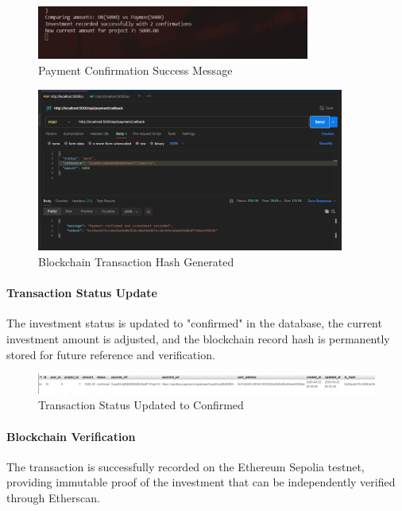 \begin{figure}[htbp]
    \centering
    \includegraphics[width=0.8\textwidth]{images/payment_confirmation_success.png}
    \caption{Payment Confirmation Success Message}
    \label{fig:payment-confirmation-success}
\end{figure}

\begin{figure}[htbp]
    \centering
    \includegraphics[width=0.9\textwidth]{images/blockchain_hash_generated.png}
    \caption{Blockchain Transaction Hash Generated}
    \label{fig:blockchain-hash-generated}
\end{figure}

\newpage
\paragraph{Transaction Status Update}
The investment status is updated to "confirmed" in the database, the current investment amount is adjusted, and the blockchain record hash is permanently stored for future reference and verification.

\begin{figure}[htbp]
    \centering
    \includegraphics[width=1\textwidth]{images/transaction_confirmed_status.png}
    \caption{Transaction Status Updated to Confirmed}
    \label{fig:transaction-confirmed-status}
\end{figure}

\paragraph{Blockchain Verification}
The transaction is successfully recorded on the Ethereum Sepolia testnet, providing immutable proof of the investment that can be independently verified through Etherscan.


